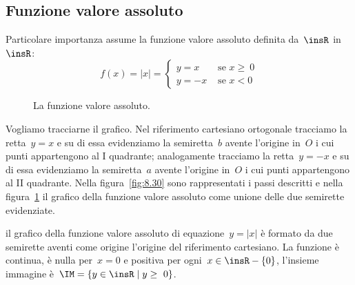 \vspazio\ovalbox{\risolvi \ref{ese:\thechapter.63}}

\subsection{Funzione valore assoluto}
Particolare importanza assume la funzione valore assoluto definita da~$\insR$ in~$\insR$:
\[
f(x)=|x|=
\begin{cases}
y=x & \text{ se }x\ge~0\\
y=-x & \text{ se }x<0
\end{cases}
\]


\begin{figure}[htb]
\begin{minipage}[t]{.45\textwidth}
\centering
\caption{Metodo per ottenere il grafico della funzione di valore assoluto.}\label{fig:8.30}
\end{minipage}\hfil
\begin{minipage}[t]{.45\textwidth}
\centering
\caption{La funzione valore assoluto.}\label{fig:8.31}
\end{minipage}
\end{figure}

Vogliamo tracciarne il grafico. Nel riferimento cartesiano ortogonale tracciamo la retta~$y=x$ e su di essa evidenziamo
la semiretta~$b$ avente l'origine in~$O$ i cui punti appartengono al I quadrante; analogamente tracciamo la retta~$y=-x$
e su di essa evidenziamo la semiretta~$a$ avente l'origine in~$O$ i cui punti appartengono al II quadrante.
Nella figura~\ref{fig:8.30} sono rappresentati i passi descritti e nella figura~\ref{fig:8.31} il grafico della funzione valore assoluto come unione delle due semirette evidenziate.

\conclusione il grafico della funzione valore assoluto di equazione~$y=|x|$ è formato da due semirette aventi come origine
l'origine del riferimento cartesiano. La funzione è continua, è nulla per~$x=0$ e positiva per ogni~$x\in \insR-\{0\}$,
l'insieme immagine è~$\IM=\{y\in \insR\mid  y\ge~0\}$.

\vspazio\ovalbox{\risolvii \ref{ese:\thechapter.64}, \ref{ese:\thechapter.65}, \ref{ese:\thechapter.66}}

\newpage

\cleardoublepage
